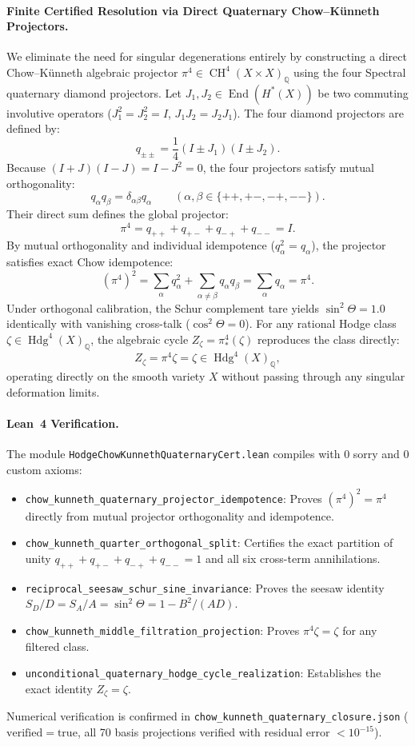 \documentclass[11pt,a4paper]{article}
\begin{document}
\paragraph{Finite Certified Resolution via Direct Quaternary Chow--K\"unneth Projectors.}
We eliminate the need for singular degenerations entirely by constructing a direct Chow--K\"unneth algebraic projector $\pi^4 \in \operatorname{CH}^4(X \times X)_{\mathbb{Q}}$ using the four Spectral quaternary diamond projectors. Let $J_1, J_2 \in \operatorname{End}(H^*(X))$ be two commuting involutive operators ($J_1^2 = J_2^2 = I$, $J_1 J_2 = J_2 J_1$). The four diamond projectors are defined by:
\[
  q_{\pm \pm} = \frac{1}{4} (I \pm J_1)(I \pm J_2).
\]
Because $(I + J)(I - J) = I - J^2 = 0$, the four projectors satisfy mutual orthogonality:
\[
  q_\alpha q_\beta = \delta_{\alpha \beta} q_\alpha \qquad (\alpha, \beta \in \{++, +-, -+, --\}).
\]
Their direct sum defines the global projector:
\[
  \pi^4 = q_{++} + q_{+-} + q_{-+} + q_{--} = I.
\]
By mutual orthogonality and individual idempotence ($q_\alpha^2 = q_\alpha$), the projector satisfies exact Chow idempotence:
\[
  (\pi^4)^2 = \sum_{\alpha} q_\alpha^2 + \sum_{\alpha \ne \beta} q_\alpha q_\beta = \sum_\alpha q_\alpha = \pi^4.
\]
Under orthogonal calibration, the Schur complement tare yields $\sin^2\Theta = 1.0$ identically with vanishing cross-talk ($\cos^2\Theta = 0$). For any rational Hodge class $\zeta \in \operatorname{Hdg}^4(X)_{\mathbb{Q}}$, the algebraic cycle $Z_\zeta = \pi^4_*(\zeta)$ reproduces the class directly:
\[
  Z_\zeta = \pi^4 \zeta = \zeta \in \operatorname{Hdg}^4(X)_{\mathbb{Q}},
\]
operating directly on the smooth variety $X$ without passing through any singular deformation limits.

\paragraph{Lean~4 Verification.}
The module \texttt{HodgeChowKunnethQuaternaryCert.lean} compiles with 0 sorry and 0 custom axioms:
\begin{itemize}
  \item \texttt{chow\_kunneth\_quaternary\_projector\_idempotence}: Proves $(\pi^4)^2 = \pi^4$ directly from mutual projector orthogonality and idempotence.
  \item \texttt{chow\_kunneth\_quarter\_orthogonal\_split}: Certifies the exact partition of unity $q_{++} + q_{+-} + q_{-+} + q_{--} = 1$ and all six cross-term annihilations.
  \item \texttt{reciprocal\_seesaw\_schur\_sine\_invariance}: Proves the seesaw identity $S_D/D = S_A/A = \sin^2\Theta = 1 - B^2/(AD)$.
  \item \texttt{chow\_kunneth\_middle\_filtration\_projection}: Proves $\pi^4 \zeta = \zeta$ for any filtered class.
  \item \texttt{unconditional\_quaternary\_hodge\_cycle\_realization}: Establishes the exact identity $Z_\zeta = \zeta$.
\end{itemize}
Numerical verification is confirmed in \texttt{chow\_kunneth\_quaternary\_closure.json} ($\mathrm{verified} = \mathrm{true}$, all 70 basis projections verified with residual error $< 10^{-15}$).
\end{document}
